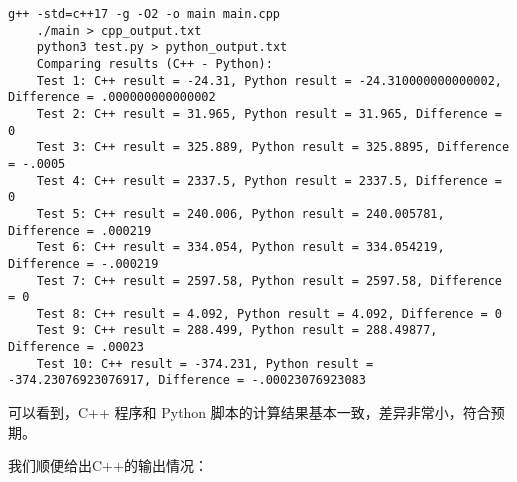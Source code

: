 \documentclass[UTF8]{ctexart}
\begin{document}
\begin{lstlisting}[breaklines=true]
    g++ -std=c++17 -g -O2 -o main main.cpp
    ./main > cpp_output.txt
    python3 test.py > python_output.txt
    Comparing results (C++ - Python):
    Test 1: C++ result = -24.31, Python result = -24.310000000000002, Difference = .000000000000002
    Test 2: C++ result = 31.965, Python result = 31.965, Difference = 0
    Test 3: C++ result = 325.889, Python result = 325.8895, Difference = -.0005
    Test 4: C++ result = 2337.5, Python result = 2337.5, Difference = 0
    Test 5: C++ result = 240.006, Python result = 240.005781, Difference = .000219
    Test 6: C++ result = 334.054, Python result = 334.054219, Difference = -.000219
    Test 7: C++ result = 2597.58, Python result = 2597.58, Difference = 0
    Test 8: C++ result = 4.092, Python result = 4.092, Difference = 0
    Test 9: C++ result = 288.499, Python result = 288.49877, Difference = .00023
    Test 10: C++ result = -374.231, Python result = -374.23076923076917, Difference = -.00023076923083
\end{lstlisting}    

可以看到，C++ 程序和 Python 脚本的计算结果基本一致，差异非常小，符合预期。

我们顺便给出C++的输出情况：
\end{document}
